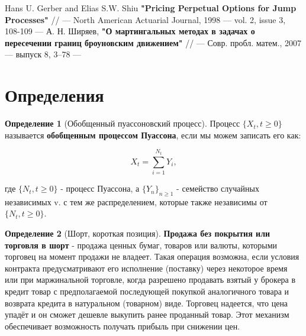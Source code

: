 \documentclass[a4paper,12pt]{article}
\theoremstyle{definition}
\newtheorem{definition}{Определение}[section]
\begin{document}
\begin{thebibliography}{3}
Hans U. Gerber and Elias S.W. Shiu \textbf{"Pricing Perpetual Options for Jump Processes"} // --- North American Actuarial Journal, 1998 --- vol. 2, issue 3, 108-109 ---
А. Н. Ширяев, \textbf{"О мартингальных методах в задачах о пересечении границ броуновским движением"} // --- Совр. пробл. матем., 2007 --- выпуск 8, 3–78 ---
\end{thebibliography}

\appendix
\section{Определения}
\begin{definition}[Обобщенный пуассоновский процесс]
    \label{def:compound_poisson}
    Процесс $\{X_t, t \ge 0\}$ называется \textbf{обобщенным процессом Пуассона}, если мы можем записать его как:
    
    \begin{equation}
        X_t = \sum_{i=1}^{N_t} Y_i,
    \end{equation}
    
    где $\{N_t, t \ge 0\}$ - процесс Пуассона, а $\{Y_n\}_{n \ge 1}$ - семейство случайных независимых v. с тем же распределением, которые также независимы от $\{N_t, t \ge 0\}$.
\end{definition}
\begin{definition}[Шорт, короткая позиция]
    \label{def:short_position}
    \textbf{Продажа без покрытия или торговля в шорт} - продажа ценных бумаг, товаров или валюты, которыми торговец на момент продажи не владеет. Такая операция возможна, если условия контракта предусматривают его исполнение (поставку) через некоторое время или при маржинальной торговле, когда разрешено продавать взятый у брокера в кредит товар с предполагаемой последующей покупкой аналогичного товара и возврата кредита в натуральном (товарном) виде. Торговец надеется, что цена упадёт и он сможет дешевле выкупить ранее проданный товар. Этот механизм обеспечивает возможность получать прибыль при снижении цен.
\end{definition}
\end{document}
